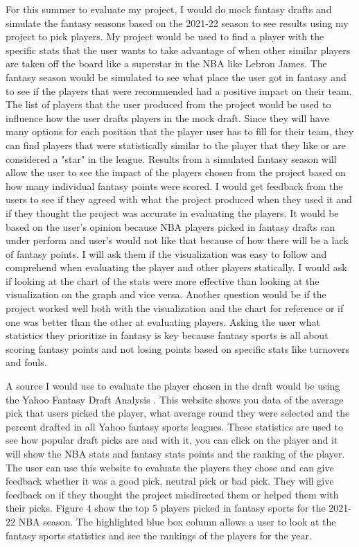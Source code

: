 \documentclass[10pt,twocolumn]{article}
\begin{document}
For this summer to evaluate my project, I would do mock fantasy drafts and simulate the fantasy seasons based on the 2021-22 season to see results using my project to pick players. My project would be used to find a player with the specific stats that the user wants to take advantage of when other similar players are taken off the board like a superstar in the NBA like Lebron James. The fantasy season would be simulated to see what place the user got in fantasy and to see if the players that were recommended had a positive impact on their team. The list of players that the user produced from the project would be used to influence how the user drafts players in the mock draft. Since they will have many options for each position that the player user has to fill for their team, they can find players that were statistically similar to the player that they like or are considered a "star" in the league. Results from a simulated fantasy season will allow the user to see the impact of the players chosen from the project based on how many individual fantasy points were scored. I would get feedback from the users to see if they agreed with what the project produced when they used it and if they thought the project was accurate in evaluating the players. It would be based on the user's opinion because NBA players picked in fantasy drafts can under perform and user's would not like that because of how there will be a lack of fantasy points. I will ask them if the visualization was easy to follow and comprehend when evaluating the player and other players statically. I would ask if looking at the chart of the stats were more effective than looking at the visualization on the graph and vice versa. Another question would be if the project worked well both with the visualization and the chart for reference or if one was better than the other at evaluating players. Asking the user what statistics they prioritize in fantasy is key because fantasy sports is all about scoring fantasy points and not losing points based on specific stats like turnovers and fouls. 

A source I would use to evaluate the player chosen in the draft would be using the Yahoo Fantasy Draft Analysis \cite{fantasy}. This website shows you data of the average pick that users picked the player, what average round they were selected and the percent drafted in all Yahoo fantasy sports leagues. These statistics are used to see how popular draft picks are and with it, you can click on the player and it will show the NBA stats and fantasy stats points and the ranking of the player. The user can use this website to evaluate the players they chose and can give feedback whether it was a good pick, neutral pick or bad pick. They will give feedback on if they thought the project misdirected them or helped them with their picks. Figure 4 show the top 5 players picked in fantasy sports for the 2021-22 NBA season. The highlighted blue box column allows a user to look at the fantasy sports statistics and see the rankings of the players for the year.
\end{document}
